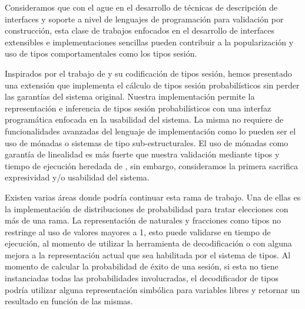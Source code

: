 Consideramos que con el ague en el desarrollo de técnicas de descripción de
interfaces y soporte a nivel de lenguajes de programación para validación por
construcción, esta clase de trabajos enfocados en el desarrollo de interfaces
extensibles e implementaciones sencillas pueden contribuir a la popularización
y uso de tipos comportamentales como los tipos sesión.

Inspirados por el trabajo de \FuSe y su codificación de tipos sesión, hemos
presentado una extensión que implementa el cálculo de tipos sesión
probabilísticos sin perder las garantías del sistema original. Nuestra
implementación permite la representación e inferencia de tipos sesión
probabilísticos con una interfaz programática enfocada en la usabilidad del
sistema. La misma no requiere de funcionalidades avanzadas del lenguaje de
implementación como lo pueden ser el uso de mónadas o sistemas de tipo
sub-estructurales. El uso de mónadas  como
garantía de linealidad es más fuerte que nuestra validación mediante tipos y
tiempo de ejecución heredada de \Fuse, sin embargo, consideramos la primera
sacrifica expresividad y/o usabilidad del sistema.

Existen varias áreas donde podría continuar esta rama de trabajo. Una de ellas
es la implementación de distribuciones de probabilidad para tratar elecciones
con más de una rama. La representación de naturales y fracciones como tipos no
restringe al uso de valores mayores a 1, esto puede validarse en tiempo de
ejecución, al momento de utilizar la herramienta de decodificación o con alguna
mejora a la representación actual que sea habilitada por el sistema de tipos.
Al momento de calcular la probabilidad de éxito de una sesión, si esta no tiene
instanciadas todas las probabilidades involucradas, el decodificador de tipos
podría utilizar alguna representación simbólica para variables libres y
retornar un resultado en función de las mismas.
